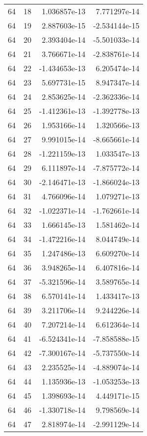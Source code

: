 \begin{tabular}{rrrr}
  64 &   18 &  1.036857e-13 &  7.771297e-14 \\
  64 &   19 &  2.887603e-15 & -2.534144e-15 \\
  64 &   20 &  2.393404e-14 & -5.501033e-14 \\
  64 &   21 &  3.766671e-14 & -2.838761e-14 \\
  64 &   22 & -1.434653e-13 &  6.205474e-14 \\
  64 &   23 &  5.697731e-15 &  8.947347e-14 \\
  64 &   24 &  2.853625e-14 & -2.362336e-14 \\
  64 &   25 & -1.412361e-13 & -1.392778e-13 \\
  64 &   26 &  1.953166e-14 &  1.320566e-13 \\
  64 &   27 &  9.991015e-14 & -8.665661e-14 \\
  64 &   28 & -1.221159e-13 &  1.033547e-13 \\
  64 &   29 &  6.111897e-14 & -7.875772e-14 \\
  64 &   30 & -2.146471e-13 & -1.866024e-13 \\
  64 &   31 &  4.766096e-14 &  1.079271e-13 \\
  64 &   32 & -1.022371e-14 & -1.762661e-14 \\
  64 &   33 &  1.666145e-13 &  1.581462e-14 \\
  64 &   34 & -1.472216e-14 &  8.044749e-14 \\
  64 &   35 &  1.247486e-13 &  6.609270e-14 \\
  64 &   36 &  3.948265e-14 &  6.407816e-14 \\
  64 &   37 & -5.321596e-14 &  3.589765e-14 \\
  64 &   38 &  6.570141e-14 &  1.433417e-13 \\
  64 &   39 &  3.211706e-14 &  9.244226e-14 \\
  64 &   40 &  7.207214e-14 &  6.612364e-14 \\
  64 &   41 & -6.524341e-14 & -7.858588e-15 \\
  64 &   42 & -7.300167e-14 & -5.737550e-14 \\
  64 &   43 &  2.235525e-14 & -4.889074e-14 \\
  64 &   44 &  1.135936e-13 & -1.053253e-13 \\
  64 &   45 &  1.398693e-14 &  4.449171e-15 \\
  64 &   46 & -1.330718e-14 &  9.798569e-14 \\
  64 &   47 &  2.818974e-14 & -2.991129e-14 \\

\end{tabular}
